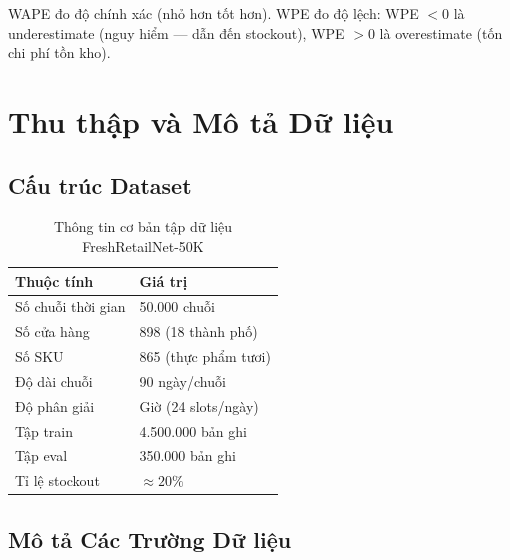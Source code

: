 \documentclass[12pt,a4paper]{report}
\begin{document}
WAPE đo độ chính xác (nhỏ hơn tốt hơn). WPE đo độ lệch: WPE $< 0$ là underestimate (nguy hiểm — dẫn đến stockout), WPE $> 0$ là overestimate (tốn chi phí tồn kho).

\section{Thu thập và Mô tả Dữ liệu}

\subsection{Cấu trúc Dataset}

\begin{table}[H]
\centering
\caption{Thông tin cơ bản tập dữ liệu FreshRetailNet-50K}
\begin{tabular}{ll}
\toprule
\textbf{Thuộc tính} & \textbf{Giá trị} \\
\midrule
Số chuỗi thời gian & 50.000 chuỗi \\
Số cửa hàng       & 898 (18 thành phố) \\
Số SKU            & 865 (thực phẩm tươi) \\
Độ dài chuỗi      & 90 ngày/chuỗi \\
Độ phân giải      & Giờ (24 slots/ngày) \\
Tập train         & 4.500.000 bản ghi \\
Tập eval          & 350.000 bản ghi \\
Tỉ lệ stockout    & $\approx 20\%$ \\
\bottomrule
\end{tabular}
\end{table}

\subsection{Mô tả Các Trường Dữ liệu}
\end{document}
